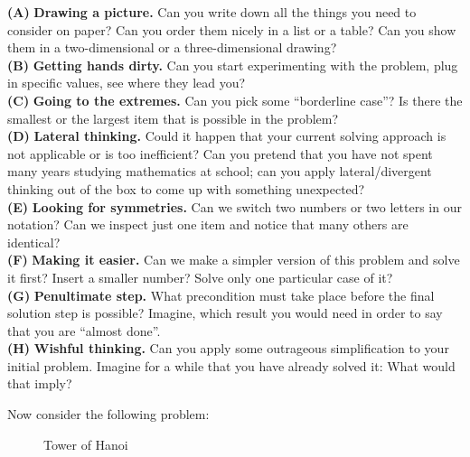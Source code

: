 \documentclass[jou]{apa6}
\begin{document}
{\footnotesize
{\bf (A)} {\bf Drawing a picture.} Can you 
write down all the things you need to consider on paper? 
Can you order them nicely in a list or a table? 
Can you show them in a two-dimensional or a three-dimensional drawing?\\
{\bf (B)} {\bf Getting hands dirty.} Can you start experimenting with the 
problem, plug in specific values, see where they lead you?\\
{\bf (C)} {\bf Going to the extremes.} Can you pick some ``borderline case''?
Is there the smallest or the largest item that is possible in the problem?\\
{\bf (D)} {\bf Lateral thinking.} Could it happen that your current solving approach 
is not applicable or is too inefficient? Can you pretend that you 
have not spent many years studying mathematics at school; 
can you apply lateral/divergent thinking out of the box to 
come up with something unexpected?\\
{\bf (E)} {\bf Looking for symmetries.} Can we switch two numbers or two letters in our 
notation? Can we inspect just one item and notice that many others are identical?\\
{\bf (F)} {\bf Making it easier.} Can we make a simpler version of this problem and
solve it first? Insert a smaller number? Solve only one particular case of it?\\
{\bf (G)} {\bf Penultimate step.} What precondition must take place before 
the final solution step is possible? Imagine, which result you would need 
in order to say that you are ``almost done''.\\
{\bf (H)} {\bf Wishful thinking.} Can you apply some outrageous simplification to your 
initial problem. Imagine for a while that you have already solved it: What would that imply?
}

Now consider the following problem:

\begin{figure}[!htb]
\caption{\label{fig:tower-of-hanoi} Tower of Hanoi}
\end{figure}
\end{document}
